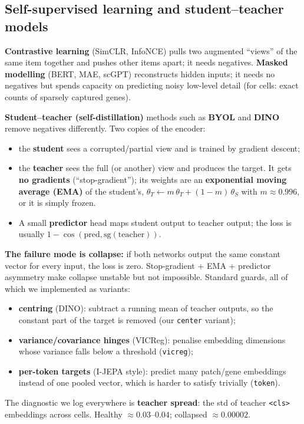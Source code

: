 \documentclass[11pt]{article}
\newcommand{\code}[1]{\texttt{\small #1}}
\begin{document}
\subsection{Self-supervised learning and student--teacher models}
\textbf{Contrastive learning} (SimCLR, InfoNCE) pulls two augmented ``views'' of the same item together and pushes other items apart; it needs negatives. \textbf{Masked modelling} (BERT, MAE, scGPT) reconstructs hidden inputs; it needs no negatives but spends capacity on predicting noisy low-level detail (for cells: exact counts of sparsely captured genes).

\textbf{Student--teacher (self-distillation)} methods such as \textbf{BYOL} and \textbf{DINO} remove negatives differently. Two copies of the encoder:
\begin{itemize}
\item the \textbf{student} sees a corrupted/partial view and is trained by gradient descent;
\item the \textbf{teacher} sees the full (or another) view and produces the target. It gets \textbf{no gradients} (``stop-gradient''); its weights are an \textbf{exponential moving average (EMA)} of the student's, $\theta_T \leftarrow m\,\theta_T + (1-m)\,\theta_S$ with $m\approx 0.996$, or it is simply frozen.
\item A small \textbf{predictor} head maps student output to teacher output; the loss is usually $1-\cos(\text{pred}, \text{sg}(\text{teacher}))$.
\end{itemize}
\textbf{The failure mode is collapse:} if both networks output the same constant vector for every input, the loss is zero. Stop-gradient + EMA + predictor asymmetry make collapse unstable but not impossible. Standard guards, all of which we implemented as variants:
\begin{itemize}
\item \textbf{centring} (DINO): subtract a running mean of teacher outputs, so the constant part of the target is removed (our \code{center} variant);
\item \textbf{variance/covariance hinges} (VICReg): penalise embedding dimensions whose variance falls below a threshold (\code{vicreg});
\item \textbf{per-token targets} (I-JEPA style): predict many patch/gene embeddings instead of one pooled vector, which is harder to satisfy trivially (\code{token}).
\end{itemize}
The diagnostic we log everywhere is \textbf{teacher spread}: the std of teacher \code{<cls>} embeddings across cells. Healthy $\approx 0.03$--$0.04$; collapsed $\approx 0.00002$.
\end{document}
